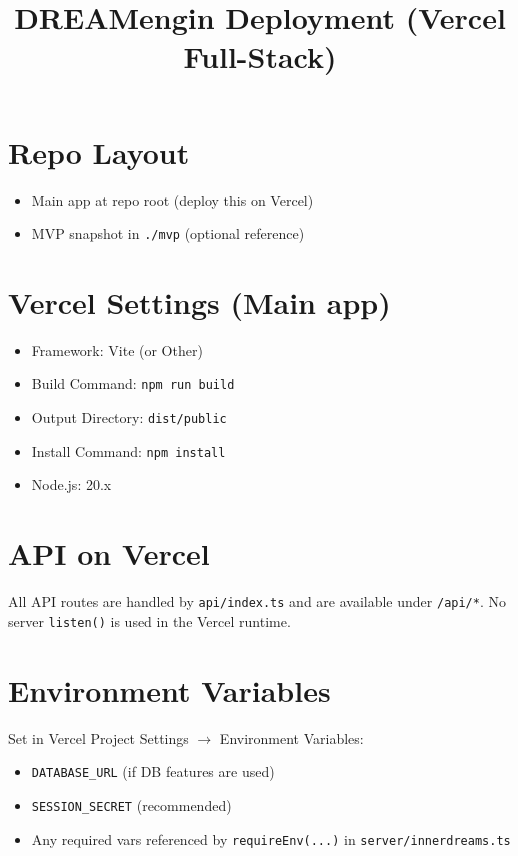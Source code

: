 \documentclass[11pt]{article}
\title{DREAMengin Deployment (Vercel Full-Stack)}
\date{}
\begin{document}
\maketitle

\section*{Repo Layout}
\begin{itemize}[leftmargin=*]
\item Main app at repo root (deploy this on Vercel)
\item MVP snapshot in \texttt{./mvp} (optional reference)
\end{itemize}

\section*{Vercel Settings (Main app)}
\begin{itemize}[leftmargin=*]
\item Framework: Vite (or Other)
\item Build Command: \texttt{npm run build}
\item Output Directory: \texttt{dist/public}
\item Install Command: \texttt{npm install}
\item Node.js: 20.x
\end{itemize}

\section*{API on Vercel}
All API routes are handled by \texttt{api/index.ts} and are available under \texttt{/api/*}.
No server \texttt{listen()} is used in the Vercel runtime.

\section*{Environment Variables}
Set in Vercel Project Settings \(\rightarrow\) Environment Variables:
\begin{itemize}[leftmargin=*]
\item \texttt{DATABASE\_URL} (if DB features are used)
\item \texttt{SESSION\_SECRET} (recommended)
\item Any required vars referenced by \texttt{requireEnv(...)} in \texttt{server/innerdreams.ts}
\end{itemize}
\end{document}
